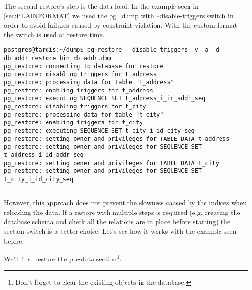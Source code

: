 The second restore's step is the data load. In the example seen in \ref{sec:PLAINFORMAT} we used 
the pg\_dump with --disable-triggers switch in order to avoid failures caused by constraint 
violation. With the custom format the switch is used at restore time.

\begin{verbatim}
postgres@tardis:~/dump$ pg_restore --disable-triggers -v -a -d db_addr_restore_bin db_addr.dmp 
pg_restore: connecting to database for restore
pg_restore: disabling triggers for t_address
pg_restore: processing data for table "t_address"
pg_restore: enabling triggers for t_address
pg_restore: executing SEQUENCE SET t_address_i_id_addr_seq
pg_restore: disabling triggers for t_city
pg_restore: processing data for table "t_city"
pg_restore: enabling triggers for t_city
pg_restore: executing SEQUENCE SET t_city_i_id_city_seq
pg_restore: setting owner and privileges for TABLE DATA t_address
pg_restore: setting owner and privileges for SEQUENCE SET t_address_i_id_addr_seq
pg_restore: setting owner and privileges for TABLE DATA t_city
pg_restore: setting owner and privileges for SEQUENCE SET t_city_i_id_city_seq
 
\end{verbatim}

However, this approach does not prevent the slowness caused by the indices when reloading the data.
If a restore with multiple steps is required (e.g. creating the database schema and check all the 
relations are in place before starting) the section switch is a better choice. Let's see how it 
works with the example seen before.\newline

We'll first restore the pre-data section\footnote{Don't forget to clear the existing objects in 
the database.}.

